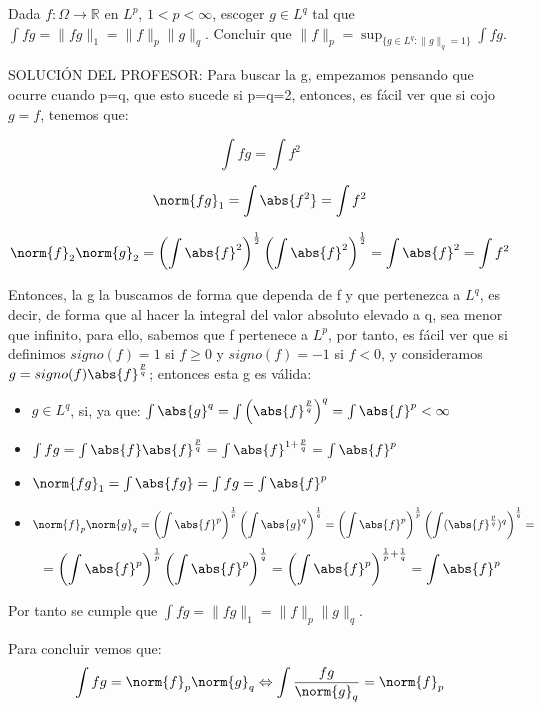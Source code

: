 
\begin{problem}[4] Dada $f:\Omega\to \mathbb{R}$ en $L^p$,  $1 < p <  \infty$, escoger $g\in L^q$ tal que
$\int fg = \|fg\|_1 = \|f\|_p\|g\|_q$. Concluir que 
$\|f\|_p= \operatorname{sup}_{\{g\in L^q: \|g\|_q=1\}} \int fg $.
\solution


SOLUCIÓN DEL PROFESOR:
Para buscar la g, empezamos pensando que ocurre cuando p=q, que esto sucede si p=q=2, entonces, es fácil ver que si cojo $g=f$, tenemos que:

\[
\int fg = \int f^2
\]

\[
\norm{fg}_1 = \int \abs{f^2} = \int f^2
\]

\[
\norm{f}_2 \norm{g}_2 = \left( \int \abs{f}^2 \right)^{\frac{1}{2}} \left( \int \abs{f}^2 \right)^{\frac{1}{2}} =  \int \abs{f}^2 = \int f^2
\]

Entonces, la g la buscamos de forma que dependa de f y  que pertenezca a $L^q$, es decir, de forma que al hacer la integral del valor absoluto elevado a q, sea menor que infinito, para ello, sabemos que f pertenece a $L^p$, por tanto, es fácil ver que si definimos $signo(f)=1$ si $f\geq0$ y $signo(f)=-1$ si $f<0$, y consideramos $g=signo(f)\abs{f}^\frac{p}{q}$; entonces esta g es válida:

\begin{itemize}
\item $g \in L^q$, si, ya que: $\int \abs{g}^q = \int\left( \abs{f}^{\frac{p}{q}}\right)^q = \int \abs{f}^p < \infty$
\item $\int fg = \int \abs{f} \abs{f}^{\frac{p}{q}} = \int \abs{f}^{1+\frac{p}{q}} = \int \abs{f}^p$
\item $\norm{fg}_1 = \int \abs{fg} = \int fg = \int \abs{f}^p$
\item $$\norm{f}_p\norm{g}_q = \left( \int \abs{f}^p \right)^\frac{1}{p} \left( \int \abs{g}^q \right)^\frac{1}{q} = \left( \int \abs{f}^p \right)^\frac{1}{p} \left( \int (\abs{f}^\frac{p}{q})^q \right)^\frac{1}{q} = $$
$$= \left( \int \abs{f}^p \right)^\frac{1}{p} \left( \int \abs{f}^p \right)^\frac{1}{q} = \left( \int \abs{f}^{p}\right)^{\frac{1}{p}+\frac{1}{q}} = \int \abs{f}^p$$
\end{itemize}

Por tanto se cumple que $\int fg = \|fg\|_1 = \|f\|_p\|g\|_q$.

Para concluir vemos que:
\[
\int fg = \norm{f}_p \norm{g}_q  \Leftrightarrow \int \frac{fg}{\norm{g}_q} = \norm{f}_p 
\]


\end{problem}
